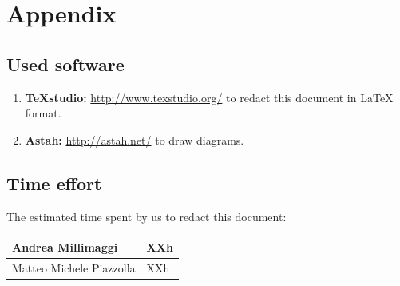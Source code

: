 \documentclass[english]{article}
\providecommand{\tabularnewline}{\\}
\begin{document}
	\listoffigures
	
	\newpage{}


	
	\pagebreak
	
	\pagebreak
	
	\pagebreak
	\section{Appendix}


	\subsection{Used software}
	\begin{enumerate}
		\item \textbf{TeXstudio:} \url{http://www.texstudio.org/} to redact this document in {\LaTeX} format.
		\item \textbf{Astah:} \url{http://astah.net/} to draw diagrams.		
	\end{enumerate}
	
	
	\subsection{Time effort}
	The estimated time spent by us to redact this document:
	\begin{center}
		\begin{adjustbox}{max width=\textwidth}	
			\begin{tabular}{|l|>{\raggedright}p{15cm}|}
				
				\hline  Andrea Millimaggi & XXh \tabularnewline
				\hline 	Matteo Michele Piazzolla & XXh \tabularnewline
				\hline 		
			\end{tabular}
		\end{adjustbox}
	\end{center}	
	
	
\end{document}
